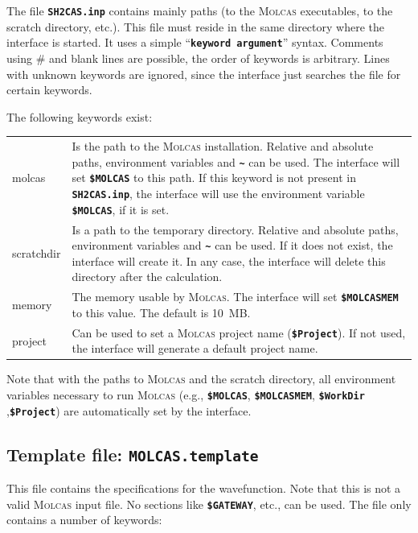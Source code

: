 \documentclass[a4paper,11pt,DIV=15,openany,twoside=false]{scrbook}
\newcommand{\ttt}[1]{\textbf{\texttt{#1}}}
\begin{document}
The file \ttt{SH2CAS.inp} contains mainly paths (to the \textsc{Molcas} executables, to the scratch directory, etc.). This file must reside in the same directory where the interface is started. It uses a simple ``\ttt{keyword argument}'' syntax. Comments using \# and blank lines are possible, the order of keywords is arbitrary. Lines with unknown keywords are ignored, since the interface just searches the file for certain keywords.

The following keywords exist:

\begin{tabular}{lp{12cm}}
molcas          &Is the path to the \textsc{Molcas} installation. Relative and absolute paths, environment variables and \ttt{\textasciitilde} can be used. The interface will set \ttt{\$MOLCAS} to this path. If this keyword is not present in \ttt{SH2CAS.inp}, the interface will use the environment variable \ttt{\$MOLCAS}, if it is set.\\
scratchdir      &Is a path to the temporary directory. Relative and absolute paths, environment variables and \ttt{\textasciitilde} can be used. If it does not exist, the interface will create it. In any case, the interface will delete this directory after the calculation.\\
memory          &The memory usable by \textsc{Molcas}. The interface will set \ttt{\$MOLCASMEM} to this value. The default is 10~MB.\\
project         &Can be used to set a \textsc{Molcas} project name (\ttt{\$Project}). If not used, the interface will generate a default project name.
\end{tabular}

Note that with the paths to \textsc{Molcas} and the scratch directory, all environment variables necessary to run \textsc{Molcas} (e.g., \ttt{\$MOLCAS}, \ttt{\$MOLCASMEM}, \ttt{\$WorkDir} ,\ttt{\$Project}) are automatically set by the interface. 

\subsection{Template file: \ttt{MOLCAS.template}}

This file contains the specifications for the wavefunction. Note that this is not a valid \textsc{Molcas} input file. No sections like \ttt{\$GATEWAY}, etc., can be used. The file only contains a number of keywords:
\end{document}

